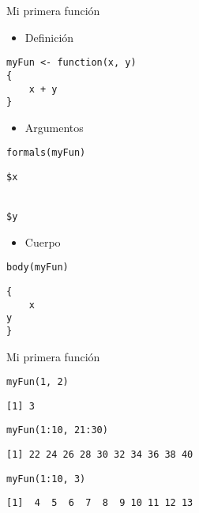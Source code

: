 \documentclass[xcolor={usenames,svgnames,dvipsnames}]{beamer}
\begin{document}
\begin{frame}[label={sec:orgfa16a57},fragile]{Mi primera función}
 \begin{itemize}
\item Definición
\end{itemize}
\lstset{language=r,label= ,caption= ,captionpos=b,numbers=none}
\begin{lstlisting}
myFun <- function(x, y)
{
    x + y
}
\end{lstlisting}

\begin{itemize}
\item Argumentos
\end{itemize}
\lstset{language=r,label= ,caption= ,captionpos=b,numbers=none}
\begin{lstlisting}
formals(myFun)
\end{lstlisting}

\begin{verbatim}
$x


$y
\end{verbatim}


\begin{itemize}
\item Cuerpo
\end{itemize}
\lstset{language=r,label= ,caption= ,captionpos=b,numbers=none}
\begin{lstlisting}
body(myFun)
\end{lstlisting}

\begin{verbatim}
{
    x
y
}
\end{verbatim}
\end{frame}

\begin{frame}[label={sec:orgd84b1d2},fragile]{Mi primera función}
 \lstset{language=r,label= ,caption= ,captionpos=b,numbers=none}
\begin{lstlisting}
myFun(1, 2)
\end{lstlisting}

\begin{verbatim}
[1] 3
\end{verbatim}


\lstset{language=r,label= ,caption= ,captionpos=b,numbers=none}
\begin{lstlisting}
myFun(1:10, 21:30)
\end{lstlisting}

\begin{verbatim}
[1] 22 24 26 28 30 32 34 36 38 40
\end{verbatim}


\lstset{language=r,label= ,caption= ,captionpos=b,numbers=none}
\begin{lstlisting}
myFun(1:10, 3)
\end{lstlisting}

\begin{verbatim}
[1]  4  5  6  7  8  9 10 11 12 13
\end{verbatim}
\end{frame}
\end{document}

